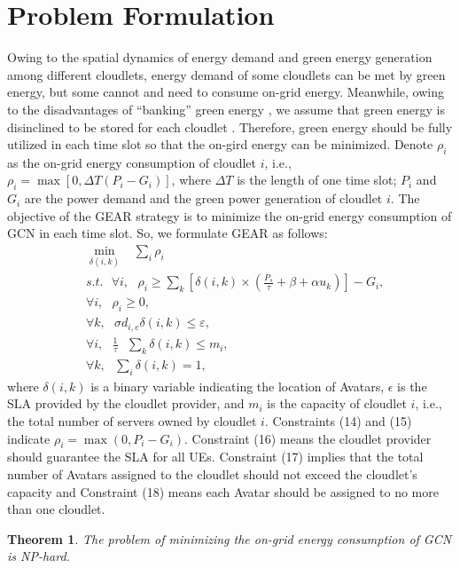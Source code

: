 \documentclass[journal,12pt,draftclsnofoot,onecolumn]{IEEEtran}
\newtheorem{theorem}{Theorem}
\begin{document}
\section{Problem Formulation}	
	Owing to the spatial dynamics of energy demand and green energy generation among different cloudlets, energy demand of some cloudlets can be met by green energy, but some cannot and need to consume on-grid energy. Meanwhile, owing to the disadvantages of “banking” green energy \cite{21}	, we assume that green energy is disinclined to be stored for each cloudlet \cite{22}. Therefore, green energy should be fully utilized in each time slot so that the on-gird energy can be minimized. Denote $\rho_i$ as the on-grid energy consumption of cloudlet $i$, i.e., ${{\rho }_{i}}=\max [0,\Delta T({{P}_{i}}-{{G}_{i}})]$, where $\Delta T$ is the length of one time slot; $P_i$ and $G_i$ are the power demand and the green power generation of cloudlet $i$. The objective of the GEAR strategy is to minimize the on-grid energy consumption of GCN in each time slot. So, we formulate GEAR as follows:	
	\begin{align}
	& \underset{\delta \left( i,k \right)}{\mathop{\min }}\,\text{   }\sum\limits_{i}{{{\rho }_{i}}} \\ 
	& s.t.\text{    }\forall i,\text{  }{{\rho }_{i}}\ge \sum\limits_{k}{\left[ \delta \left( i,k \right)\times \left( \frac{{{P}_{s}}}{\tau }+\beta +\alpha {{u}_{k}} \right) \right]}-{{G}_{i}}, \\ 
	& \forall i,\text{   }{{\rho }_{i}}\ge 0, \\ 
	& \forall k,\text{  }\sigma {{d}_{i,e}}\delta \left( i,k \right)\le \varepsilon , \\ 
	& \forall i,\text{   }\frac{1}{\tau }\text{ }\sum\limits_{k}{\delta \left( i,k \right)}\le {{m}_{i}}, \\ 
	& \forall k,\text{   }\sum\limits_{i}{\delta \left( i,k \right)}=1, 
	\end{align}	
	where  $\delta(i,k)$ is a binary variable indicating the location of Avatars, $\epsilon$ is the SLA provided by the cloudlet provider, and $m_i$ is the capacity of cloudlet $i$, i.e., the total number of servers owned by cloudlet $i$. Constraints (14) and (15) indicate ${{\rho }_{i}}=\max (0,{{P}_{i}}-{{G}_{i}})$. Constraint (16) means the cloudlet provider should guarantee the SLA for all UEs. Constraint (17) implies that the total number of Avatars assigned to the cloudlet should not exceed the cloudlet's capacity and Constraint (18) means each Avatar should be assigned to no more than one cloudlet. \
	\begin{theorem}
	The problem of minimizing the on-grid energy consumption of GCN is NP-hard.
	\end{theorem} 
	
\end{document}
